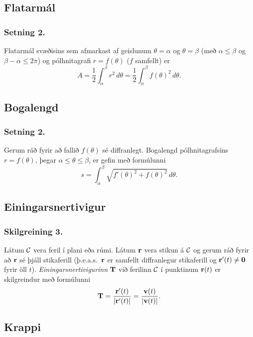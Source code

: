 \subsection{Flatarmál}
 \subsubsection{Setning 2.}
  Flatarmál svæðisins sem afmarkast af geislunum 
$\theta=\alpha$ og $\theta=\beta$ (með $\alpha\leq \beta$ og $\beta-\alpha\leq 2\pi$) og pólhnitagrafi $r=f(\theta)$ ($f$ samfellt) er
$$A=\frac{1}{2}\int_\alpha^\beta r^2\,d\theta
=\frac{1}{2}\int_\alpha^\beta f(\theta)^2\,d\theta.$$
 



\subsection{Bogalengd}
 \subsubsection{Setning 2.}
   Gerum ráð fyrir að fallið $f(\theta)$ sé diffranlegt. Bogalengd pólhnitagrafsins $r=f(\theta)$, þegar $\alpha\leq\theta\leq\beta$, er gefin með formúlunni 
$$s=\int_\alpha^\beta \sqrt{f'(\theta)^2+f(\theta)^2}\,d\theta.$$
 



\subsection{Einingarsnertivigur} 

\subsubsection{Skilgreining 3.}
Látum $\cal C$ vera feril í plani eða rúmi.
Látum $\mbox{${\bf r}$}$ vera stikun á $\cal C$ og gerum ráð fyrir að $\mbox{${\bf r}$}$ sé
þjáll stikaferill (þ.e.a.s.~$\mbox{${\bf r}$}$ er samfellt diffranlegur stikaferill og
$\mbox{${\bf r}$}'(t)\neq \mbox{${\bf 0}$}$ fyrir öll $t$).  {\em Einingarsnertivigurinn} $\mbox{${\bf T}$}$ við
ferilinn $\cal C$ í punktinum $\mbox{${\bf r}$}(t)$ er skilgreindur  með formúlunni  
$$\mbox{${\bf T}$}=\frac{\mbox{${\bf r}$}'(t)}{|\mbox{${\bf r}$}'(t)|}=\frac{\mbox{${\bf v}$}(t)}{|\mbox{${\bf v}$}(t)|}.$$




\subsection{Krappi}
